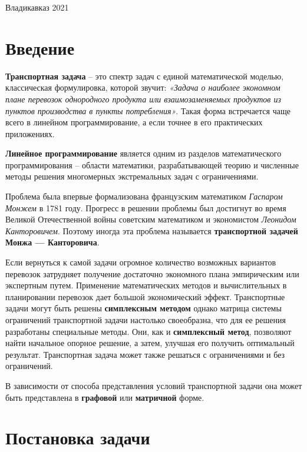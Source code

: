 \documentclass[a4paper,12pt]{article}
\begin{document}
\normalsize{ \hspace{28pt}} \hfill \break
\begin{center} Владикавказ 2021 \end{center}

\thispagestyle{empty}
\tableofcontents{}
\thispagestyle{empty}
\clearpage

\section{Введение}
	\textbf{Транспортная задача} – это спектр задач с единой математической моделью, классическая формулировка, которой звучит: \textit{«Задача о наиболее экономном плане перевозок однородного продукта или взаимозаменяемых продуктов из пунктов производства в пункты потребления»}. Такая форма встречается чаще всего в линейном программирование, а если точнее в его практических приложениях. 
	
	\textbf{Линейное программирование} является одним из разделов математического программирования – области математики, разрабатывающей теорию и численные методы решения многомерных экстремальных задач с ограничениями.
	
	Проблема была впервые формализована французским математиком \textit{Гаспаром Монжем} в 1781 году. Прогресс в решении проблемы был достигнут во время Великой Отечественной войны советским математиком и экономистом \textit{Леонидом Канторовичем}. Поэтому иногда эта проблема называется \textbf{транспортной задачей Монжа — Канторовича}.
	
	Если вернуться к самой задачи огромное количество возможных вариантов перевозок затрудняет получение достаточно экономного плана эмпирическим или экспертным путем. Применение математических методов и вычислительных в планировании перевозок дает большой экономический эффект. Транспортные задачи могут быть решены \textbf{симплексным методом} однако матрица системы ограничений транспортной задачи настолько своеобразна, что для ее решения разработаны специальные методы. Они, как и \textbf{симплексный метод}, позволяют найти начальное опорное решение, а затем, улучшая его получить оптимальный результат. Транспортная задача может
	также решаться с ограничениями и без ограничений.
	
	В зависимости от способа представления условий транспортной задачи она может быть представлена в \textbf{графовой} или \textbf{матричной} форме.
	
	\clearpage
	
\section{Постановка задачи}
	
\end{document}
